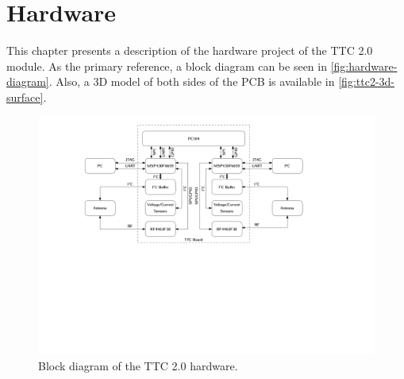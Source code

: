 %
%
%
%
%

%
%
%
%
%


\chapter{Hardware} \label{ch:hardware}

This chapter presents a description of the hardware project of the TTC 2.0 module. As the primary reference, a block diagram can be seen in \autoref{fig:hardware-diagram}. Also, a 3D model of both sides of the PCB is available in \autoref{fig:ttc2-3d-surface}.

\begin{figure}[!ht]
	\begin{center}
		\includegraphics[width=\textwidth]{figures/hardware_diagram.pdf}
		\caption{Block diagram of the TTC 2.0 hardware.}
		\label{fig:hardware-diagram}
	\end{center}
\end{figure}

